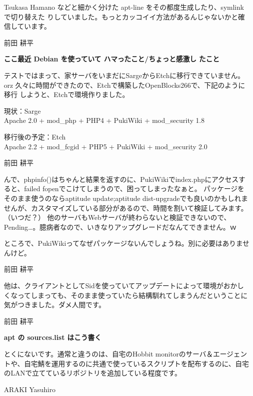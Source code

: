 \documentclass[cjk,dvipdfmx,12pt]{beamer}
\begin{document}
\begin{frame}[containsverbatim]{Tsukasa Hamano}
などと細かく分けた apt-line をその都度生成したり、symlink で切り替えた
りしていました。もっとカッコイイ方法があるんじゃないかと確信しています。

\end{frame}\begin{frame}{前田 耕平}

\textbf{ここ最近 Debian を使っていて ハマったこと/ちょっと感激し
   たこと}

テストではまって、家サーバをいまだにSargeからEtchに移行できていません。orz
久々に時間ができたので、Etchで構築したOpenBlocks266で、下記のように移行
しようと、Etchで環境作りました。

現状：Sarge\\
Apache 2.0 + mod\_php + PHP4 + PukiWiki + mod\_security 1.8

移行後の予定：Etch\\
Apache 2.2 + mod\_fcgid + PHP5 + PukiWiki + mod\_security 2.0

\end{frame}\begin{frame}{前田 耕平}

んで、phpinfo()はちゃんと結果を返すのに、PukiWikiでindex.phpにアクセスすると、failed
fopenでこけてしまうので、困ってしまったなぁと。
パッケージをそのまま使うのならaptitude update;aptitude
dist-upgradeでも良いのかもしれませんが、カスタマイズしている部分があるので、時間を割いて検証してみます。（いつだ？）
他のサーバもWebサーバが終わらないと検証できないので、Pending…。臆病者なので、いきなりアップグレードだなんてできません。ｗ

ところで、PukiWikiってなぜパッケージないんでしょうね。別に必要はありませんけど。


\end{frame}\begin{frame}{前田 耕平}

他は、クライアントとしてSidを使っていてアップデートによって環境がおかしくなってしまっても、そのまま使っていたら結構馴れてしまうんだということに気がつきました。ダメ人間です。

\end{frame}\begin{frame}{前田 耕平}

\textbf{apt の sources.list はこう書く}

とくにないです。通常と違うのは、自宅のHobbit
monitorのサーバ＆エージェントや、自宅鯖を運用するのに共通で使っているスクリプトを配布するのに、自宅のLANで立てているリポジトリを追加している程度です。

\end{frame}\begin{frame}[containsverbatim]{ARAKI Yasuhiro}


\end{frame}
\end{document}
